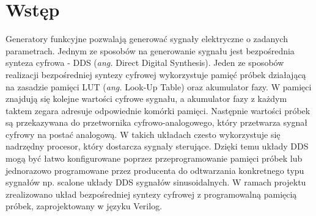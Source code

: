 \section{Wstęp}
    Generatory funkcyjne pozwalają generować sygnały elektryczne o zadanych parametrach. 
    Jednym ze sposobów na generowanie sygnału jest bezpośrednia synteza cyfrowa - DDS (\textit{ang.} 
    Direct Digital Synthesis). Jeden ze sposobów realizacji bezpośredniej syntezy cyfrowej 
    wykorzystuje pamięć próbek działającą na zasadzie pamięci LUT (\textit{ang.} Look-Up Table) oraz 
    akumulator fazy. W pamięci znajdują się kolejne wartości cyfrowe sygnału, a akumulator fazy z 
    każdym taktem zegara adresuje odpowiednie komórki pamięci. Następnie wartości próbek są przekazywana 
    do przetwornika cyfrowo-analogowego, który przetwarza sygnał cyfrowy na postać analogową. W takich 
    układach czesto wykorzystuje się nadrzędny procesor, który dostarcza sygnały sterujące. 
    Dzięki temu układy DDS mogą być łatwo konfigurowane poprzez przeprogramowanie pamięci próbek 
    lub jednorazowo programowane przez producenta do odtwarzania konkretnego typu sygnałów np. scalone 
    układy DDS sygnałów sinusoidalnych. W ramach projektu zrealizowano układ bezpośredniej syntezy 
    cyfrowej z programowalną pamięcią próbek, zaprojektowany w języku Verilog. 